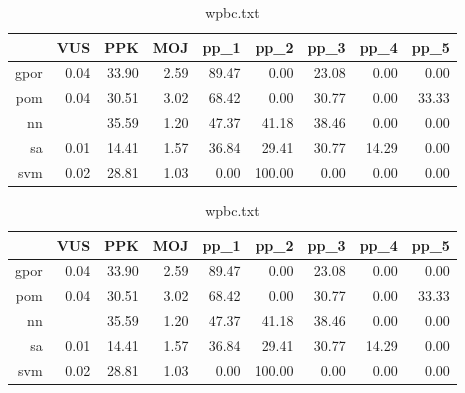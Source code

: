 \documentclass[10pt,a4paper]{article}
\begin{document}
\begin{table}[ht]
\centering
\begin{tabular}{rrrrrrrrr}
  \hline
 & VUS & PPK & MOJ & pp\_1 & pp\_2 & pp\_3 & pp\_4 & pp\_5 \\ 
  \hline
gpor & 0.04 & 33.90 & 2.59 & 89.47 & 0.00 & 23.08 & 0.00 & 0.00 \\ 
  pom & 0.04 & 30.51 & 3.02 & 68.42 & 0.00 & 30.77 & 0.00 & 33.33 \\ 
  nn &  & 35.59 & 1.20 & 47.37 & 41.18 & 38.46 & 0.00 & 0.00 \\ 
  sa & 0.01 & 14.41 & 1.57 & 36.84 & 29.41 & 30.77 & 14.29 & 0.00 \\ 
  svm & 0.02 & 28.81 & 1.03 & 0.00 & 100.00 & 0.00 & 0.00 & 0.00 \\ 
   \hline
\end{tabular}
\caption{wpbc.txt} 
\end{table}%
\begin{table}[ht]
\centering
\begin{tabular}{rrrrrrrrr}
  \hline
 & VUS & PPK & MOJ & pp\_1 & pp\_2 & pp\_3 & pp\_4 & pp\_5 \\ 
  \hline
gpor & 0.04 & 33.90 & 2.59 & 89.47 & 0.00 & 23.08 & 0.00 & 0.00 \\ 
   \rowcolor[gray]{0.95}pom & 0.04 & 30.51 & 3.02 & 68.42 & 0.00 & 30.77 & 0.00 & 33.33 \\ 
  nn &  & 35.59 & 1.20 & 47.37 & 41.18 & 38.46 & 0.00 & 0.00 \\ 
  sa & 0.01 & 14.41 & 1.57 & 36.84 & 29.41 & 30.77 & 14.29 & 0.00 \\ 
   \rowcolor[gray]{0.7}svm & 0.02 & 28.81 & 1.03 & 0.00 & 100.00 & 0.00 & 0.00 & 0.00 \\ 
   \hline
\end{tabular}
\caption{wpbc.txt} 
\end{table}
\end{document}
